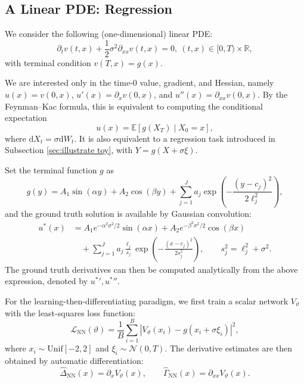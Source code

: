 \documentclass[twoside,11pt]{article}
\newcommand{\dd}{\mathrm{d}}
\newcommand{\E}{\mathbb{E}}
\newcommand{\1}{\mathbf{1}}
\numberwithin{equation}{section}
\begin{document}
\subsection{A Linear PDE: Regression}
\label{subsec:spiky-diagnostic}
We consider the following  (one-dimensional) linear PDE: %
\begin{equation}
\label{eq:spiky-value}
\partial_t v(t,x) + \frac{1}{2}\sigma^2\partial_{xx}v(t,x) = 0,\  (t,x)\in [0,T)\times \mathbb R,
\end{equation}
with terminal condition $v(T,x) = g(x)$.

We are interested only in the time-0 value, gradient, and Hessian, namely $u(x)=v(0,x)$, $u'(x)=\partial_x v(0,x)$, and $u''(x)=\partial_{xx} v(0,x)$. By the Feynman--Kac formula, this is equivalent to computing the conditional expectation
\[ u(x) = \E\left[g\left(X_T\right)\mid X_0 =x  \right], \]
where $\dd X_t = \sigma \dd W_t$. It is also equivalent  to a regression task introduced in Subsection \ref{sec:illustrate toy}, with $Y = g(X + \sigma \xi)$.

Set the terminal function $g$ as
\begin{equation}
    g(y)
    =
    A_1\sin(\alpha y)+A_2\cos(\beta y)
    +
    \sum_{j=1}^{J}
    a_j
    \exp\left(
        -\frac{(y-c_j)^2}{2\ell_j^2}
    \right),
\end{equation}
and the ground truth solution is available by Gaussian convolution:
\begin{equation}
\begin{aligned}
u^*(x)
&=
A_1 e^{-\alpha^2\sigma^2/2}\sin(\alpha x)
+
A_2 e^{-\beta^2\sigma^2/2}\cos(\beta x)  \\
&\quad+
\sum_{j=1}^{J}
a_j
\frac{\ell_j}{s_j}
\exp\left(
-\frac{(x-c_j)^2}{2s_j^2}
\right),
\qquad
s_j^2=\ell_j^2+\sigma^2 .
\end{aligned}
\end{equation}
The ground truth derivatives can then be computed analytically from the above expression, denoted by ${u^*}',{u^*}''$.

For the learning-then-differentiating paradigm, we first train a scalar network \(V_\vartheta\) with the least-squares loss function:
\begin{equation}
    \mathcal L_{\mathrm{NN}}(\vartheta)
    =
    \frac1B
    \sum_{i=1}^{B}
    \left|
        V_\vartheta(x_i)-g(x_i+\sigma\xi_i)
    \right|^2 ,
\end{equation}
where \(x_i\sim\mathrm{Unif}[-2,2]\) and
\(\xi_i\sim\mathcal N(0,T)\). The derivative estimates are then obtained by
automatic differentiation:
\[
    \widehat\Delta_{\mathrm{NN}}(x)=\partial_xV_\vartheta(x),
    \qquad
    \widehat\Gamma_{\mathrm{NN}}(x)=\partial_{xx}V_\vartheta(x).
\]
\end{document}
